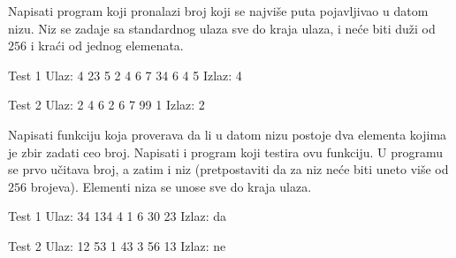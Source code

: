 \begin{Answer}[ref=502]
\end{Answer}
\begin{Exercise}[label=503]
  Napisati program koji pronalazi broj koji se najviše puta
  pojavljivao u datom nizu. Niz se zadaje sa standardnog ulaza sve do
  kraja ulaza, i neće biti duži od $256$ i kraći od jednog
  elemenata. 
  
\begin{miditest}
\begin{test}{Test 1}
Ulaz:   4 23 5 2 4 6 7 34 6 4 5
Izlaz:  4
\end{test}
\end{miditest}
\begin{miditest}
\begin{test}{Test 2}
Ulaz:   2 4 6 2 6 7 99 1
Izlaz:  2
\end{test}
\end{miditest}
  
\end{Exercise}

\begin{Answer}[ref=503]
\end{Answer}
\begin{Exercise}[label=504]
  Napisati funkciju koja proverava da li u datom nizu postoje dva
  elementa kojima je zbir zadati ceo broj. Napisati i program koji
  testira ovu funkciju. U programu se prvo učitava broj, a zatim i niz
  (pretpostaviti da za niz neće biti uneto više od $256$ brojeva).
  Elementi niza se unose sve do kraja ulaza. 
  
\begin{miditest}
\begin{test}{Test 1}
Ulaz:   34 134 4 1 6 30 23
Izlaz:  da
\end{test}
\end{miditest}
\begin{miditest}
\begin{test}{Test 2}
Ulaz:   12 53 1 43 3 56 13
Izlaz:  ne
\end{test}
\end{miditest}
  
\end{Exercise}

